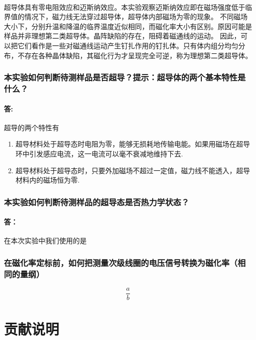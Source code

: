 \documentclass{ctexart}
\theoremstyle{ansstyle}
\begin{document}
\paragraph*{}超导体具有零电阻效应和迈斯纳效应。本实验观察迈斯纳效应即在磁场强度低于临界值的情况下，磁力线无法穿过超导体，超导体内部磁场为零的现象。
不同磁场大小下，分别升温和降温的临界温度近似相同，而磁化率大小有区别。原因可能是样品并非理想第二类超导体。晶阵缺陷的存在，阻碍着磁通线的运动。
因此，可以把它们看作是一些对磁通线运动产生钉扎作用的钉扎体。只有体内组分均匀分布，不存在各种晶体缺陷，其磁化行为才呈现完全可逆，称为理想第二类超导体。


\subsubsection{本实验如何判断待测样品是否超导？提示：超导体的两个基本特性是
	什么？}
	\paragraph{答:} 超导的两个特性有
	\begin{enumerate}
		\item 超导材料处于超导态时电阻为零，能够无损耗地传输电能。如果用磁场在超导环中引发感应电流，这一电流可以毫不衰减地维持下去.
		\item 超导材料处于超导态时，只要外加磁场不超过一定值，磁力线不能透入，超导材料内的磁场恒为零.
	\end{enumerate}	
	
\subsubsection{本实验如何判断待测样品的超导态是否热力学状态？ }
\paragraph{答：} 在本次实验中我们使用的是
\subsubsection{在磁化率定标前，如何把测量次级线圈的电压信号转换为磁化率（相同的量纲）}

	


\appendix
\begin{equation}
	\dfrac{a}{b} 
\end{equation}

\section{贡献说明}
\end{document}
